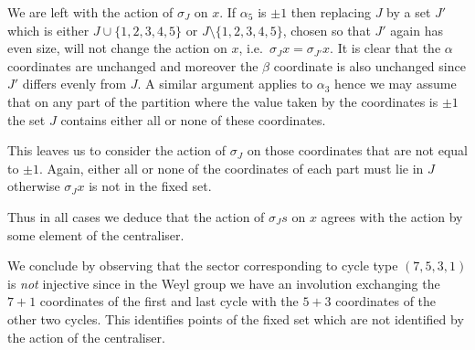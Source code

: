 \documentclass[11pt,a4paper]{article}
\begin{document}
We are left with the action of $\sigma_J$ on $x$. If $\alpha_5$ is $\pm1$ then replacing $J$ by a set $J'$ which is either $J\cup\{1,2,3,4,5\}$ or $J\setminus \{1,2,3,4,5\}$, chosen so that $J'$ again has even size, will not change the action on $x$, i.e.\ $\sigma_J x = \sigma_{J'} x$. 
It is clear that the $\alpha$ coordinates are unchanged and moreover the $\beta$ coordinate is also unchanged since $J'$ differs evenly from $J$. A similar argument applies to $\alpha_3$ hence we may assume that on any part of the partition where the value taken by the coordinates is $\pm1$ the set $J$ contains either all or none of these coordinates.

This leaves us to consider the action of $\sigma_J$ on those coordinates that are not equal to $\pm1$. Again, either all or none of the coordinates of each part must lie in $J$ otherwise $\sigma_Jx$ is not in the fixed set.

Thus in all cases we deduce that the action of $\sigma_Js$ on $x$ agrees with the action by some element of the centraliser.


\bigskip

We conclude by observing that the sector corresponding to cycle type $(7,5,3,1)$ is \emph{not} injective since in the Weyl group we have an involution exchanging the $7+1$ coordinates of the first and last cycle with the $5+3$ coordinates of the other two cycles.  This identifies points of the fixed set which are not identified by the action of the centraliser.
\end{document}
